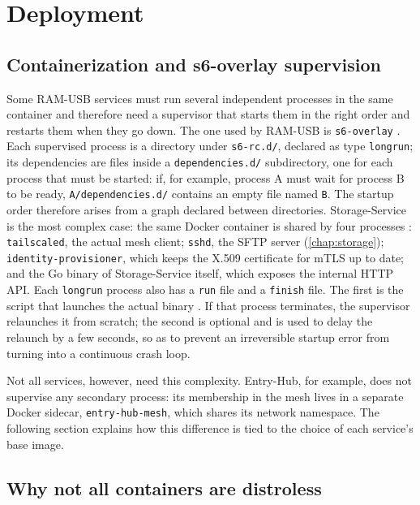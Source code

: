 \chapter{Deployment}
\label{chap:deployment}

\section{Containerization and s6-overlay supervision}
\label{sec:s6-overlay}

Some RAM-USB services must run several independent processes in the same container and
therefore need a supervisor that starts them in the right order and restarts them when they go down.
The one used by RAM-USB is \texttt{s6-overlay} \cite{s6-overlay-github}.
Each supervised process is a directory under \texttt{s6-rc.d/}, declared as type \texttt{longrun};
its dependencies are files inside a \texttt{dependencies.d/} subdirectory, one for each process that
must be started: if, for example, process A must wait for process B to be ready,
\texttt{A/dependencies.d/} contains an empty file named \texttt{B}.
The startup order therefore arises from a graph declared between directories.
Storage-Service is the most complex case: the same Docker container is shared by four processes
\cite{ramusb-code-storage-s6-tree}: \texttt{tailscaled}, the actual mesh client; \texttt{sshd}, the
SFTP server (\autoref{chap:storage}); \texttt{identity-provisioner}, which keeps the X.509 certificate
for mTLS up to date; and the Go binary of Storage-Service itself, which exposes the internal HTTP API.
Each \texttt{longrun} process also has a \texttt{run} file and a \texttt{finish} file. The first is the
script that launches the actual binary \cite{ramusb-code-storage-s6-tree}.
If that process terminates, the supervisor relaunches it from scratch;
the second is optional and is used to delay the relaunch by a few seconds, so as to prevent an irreversible
startup error from turning into a continuous crash loop.

Not all services, however, need this complexity. Entry-Hub, for example, does not supervise
any secondary process: its membership in the mesh lives in a separate Docker sidecar,
\texttt{entry-hub-mesh}, which shares its network namespace. The following section explains how
this difference is tied to the choice of each service's base image.

\section{Why not all containers are distroless}
\label{sec:distroless}

